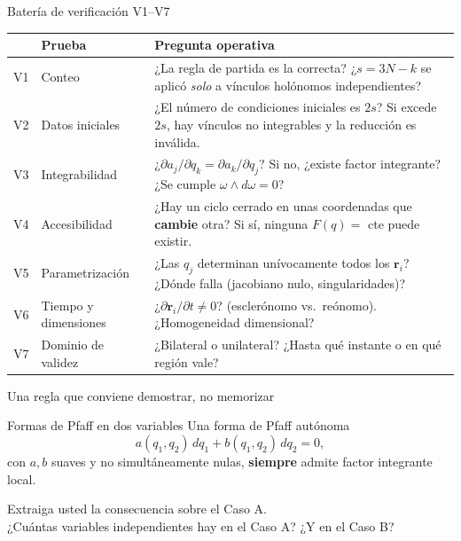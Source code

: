 \documentclass[10pt,aspectratio=169]{beamer}
\newcommand{\rv}{\mathbf{r}}
\begin{document}
\begin{frame}{Batería de verificación V1--V7}
  \small
  \begin{table}
  \begin{tabular}{@{}cp{2.7cm}p{9.4cm}@{}}
    \toprule
    & \textbf{Prueba} & \textbf{Pregunta operativa} \\
    \midrule
    V1 & Conteo & ¿La regla de partida es la correcta? ¿$s=3N-k$ se aplicó \emph{solo} a vínculos holónomos independientes? \\
    V2 & Datos iniciales & ¿El número de condiciones iniciales es $2s$? Si excede $2s$, hay vínculos no integrables y la reducción es inválida. \\
    V3 & Integrabilidad & ¿$\partial a_j/\partial q_k=\partial a_k/\partial q_j$? Si no, ¿existe factor integrante? ¿Se cumple $\omega\wedge d\omega=0$? \\
    V4 & Accesibilidad & ¿Hay un ciclo cerrado en unas coordenadas que \textbf{cambie} otra? Si sí, ninguna $F(q)=$ cte puede existir. \\
    V5 & Parametrización & ¿Las $q_j$ determinan unívocamente todos los $\rv_i$? ¿Dónde falla (jacobiano nulo, singularidades)? \\
    V6 & Tiempo y dimensiones & ¿$\partial\rv_i/\partial t\neq 0$? (esclerónomo vs.\ reónomo). ¿Homogeneidad dimensional? \\
    V7 & Dominio de validez & ¿Bilateral o unilateral? ¿Hasta qué instante o en qué región vale? \\
    \bottomrule
  \end{tabular}
  \end{table}
\end{frame}

\begin{frame}{Una regla que conviene demostrar, no memorizar}
  \begin{block}{Formas de Pfaff en dos variables}
    Una forma de Pfaff autónoma
    \[
      a(q_1,q_2)\,dq_1 + b(q_1,q_2)\,dq_2 = 0 ,
    \]
    con $a,b$ suaves y no simultáneamente nulas, \textbf{siempre} admite factor integrante local.
  \end{block}
  \pause
  \begin{center}
    \alert{Extraiga usted la consecuencia sobre el Caso A.}\\[0.4em]
    ¿Cuántas variables independientes hay en el Caso A? ¿Y en el Caso B?
  \end{center}
\end{frame}
\end{document}
